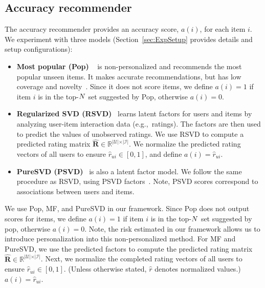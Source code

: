 \subsection{Accuracy recommender}
\label{sec:accuracyRecommender}
The accuracy recommender provides an accuracy score, $a(i)$, for each  item $i$.  We experiment with three models (Section~\ref{sec:ExpSetup} provides details and setup configurations): 
\begin{itemize}
\item \textbf{Most popular (Pop)} ~\cite{cremonesi2010performance}  is non-personalized and recommends the most popular unseen items. It makes accurate recommendations, but has low coverage and novelty~\cite{cremonesi2010performance}. Since it does  not score items, we define $a(i)=1$ if item $i$ is in the top-$N$ set suggested by Pop, otherwise $a(i)=0$. 


\item \textbf{Regularized SVD (RSVD)}~\cite{zhuang2013fast} learns latent factors for users and items by analyzing  user-item interaction data (e.g.,~ratings). The  factors  are then used to predict the values of unobserved ratings. We use RSVD to compute a predicted rating matrix $\mathbf{\hat{R}} \in \mathbb{R}^{\vert \mathcal{U} \vert \times \vert \mathcal{I} \vert}$. We normalize the predicted rating vectors  of all users  to ensure  $\hat{r}_{ui} \in [0,1]$, and define $a(i) =\hat{r}_{ui}$. %


\item  \textbf{PureSVD (PSVD)}~\cite{cremonesi2010performance} is also a latent factor model.  We follow the same procedure  as RSVD, using PSVD factors~\cite{cremonesi2010performance}. Note, PSVD scores  correspond to associations between users and items.
\end{itemize}
\iffalse
 We use Pop, MF, and PureSVD in our framework.  Since Pop does not output scores for items, we define $a(i)=1$ if item $i$ is in the top-$N$ set suggested by pop, otherwise $a(i)=0$. Note, the risk estimated in our framework  allows us to introduce personalization into this non-personalized method.
For MF and PureSVD, we use the predicted factors to compute the predicted rating matrix $\mathbf{\hat{R}} \in \mathbb{R}^{\vert \mathcal{U} \vert \times \vert \mathcal{I} \vert}$.   Next, we normalize the completed rating vectors  of all users to ensure  $\hat{r}_{ui} \in [0,1]$. (Unless otherwise stated, $\hat{r}$ denotes normalized values.) $a(i) =\hat{r}_{ui} $. %
